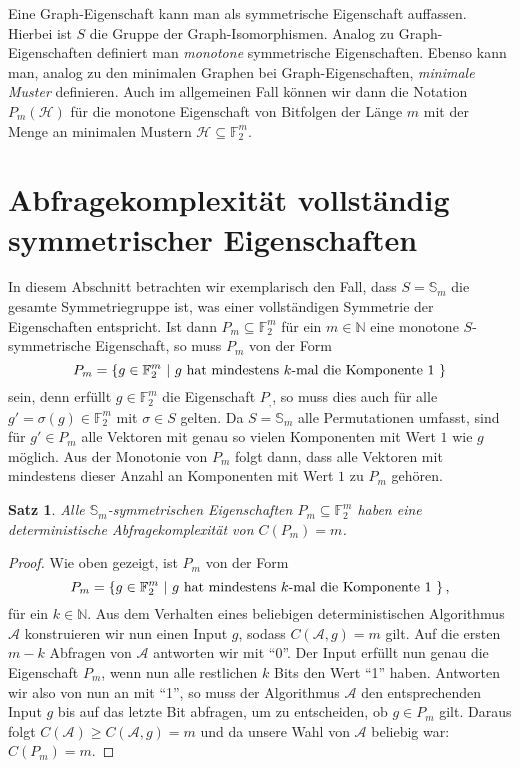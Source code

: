 \documentclass[10pt,a4paper, footheight=1mm]{scrreprt}
\newtheorem{Satz}[definition]{Satz}
\theoremstyle{definition}
\begin{document}
Eine Graph-Eigenschaft kann man als symmetrische
Eigenschaft auffassen. Hierbei ist $S$ die Gruppe
der Graph-Isomorphismen.
Analog zu Graph-Eigenschaften definiert man
\emph{monotone} symmetrische Eigenschaften. 
Ebenso kann man, analog zu den minimalen Graphen bei
Graph-Eigenschaften, \emph{minimale Muster} definieren.
Auch im allgemeinen Fall können wir dann die Notation
$P_m(\mathcal{H})$ für die monotone Eigenschaft
von Bitfolgen der Länge $m$ mit der Menge an minimalen
Mustern $\mathcal{H}\subseteq \mathbb{F}_2^m$.

\section{Abfragekomplexität vollständig symmetrischer Eigenschaften}
In diesem Abschnitt betrachten wir exemplarisch
den Fall, dass $S=\mathbb{S}_m$ die gesamte Symmetriegruppe
ist, was einer vollständigen Symmetrie der Eigenschaften entspricht.
Ist dann $P_m\subseteq \mathbb{F}_2^m$ für ein $m\in\mathbb{N}$ eine monotone 
$S$-symmetrische Eigenschaft, so muss 
$P_m$ von der Form 
$$ P_m= \{ g\in \mathbb{F}_2^m \ |
\ g \textup{ hat mindestens } k\textup{-mal die Komponente } 1 \ \}$$
sein, denn erfüllt $g\in \mathbb{F}_2^m$ die Eigenschaft
$P_,$, so muss dies auch für alle $g'=\sigma(g)\in\mathbb{F}_2^m$
mit $\sigma\in S$ gelten. Da $S=\mathbb{S}_m$ alle Permutationen
umfasst, sind für $g'\in P_m$ alle Vektoren mit
genau so vielen Komponenten mit Wert $1$ wie $g$ möglich. Aus der
Monotonie von $P_m$ folgt dann, dass alle Vektoren mit
mindestens dieser Anzahl an Komponenten mit Wert $1$ zu
$P_m$ gehören.
\begin{Satz}
\label{thm:SymmetrischeGruppe}
Alle $\mathbb{S}_m$-symmetrischen Eigenschaften 
$P_m \subseteq \mathbb{F}_2^m$ haben eine
deterministische Abfragekomplexität
von $C(P_m) = m$.
\end{Satz}
\begin{proof}
Wie oben gezeigt, ist $P_m$ von der Form
$$ P_m= \{ g\in \mathbb{F}_2^m \ |
\ g \textup{ hat mindestens } k\textup{-mal die Komponente } 1 \ \}\,,$$
für ein $k\in \mathbb{N}$.
Aus dem Verhalten eines beliebigen deterministischen Algorithmus
$\mathcal{A}$ konstruieren wir nun einen Input $g$,
sodass $C(\mathcal{A},g)=m$ gilt. Auf die ersten $m-k$
Abfragen von $\mathcal{A}$ antworten wir mit "`0"'.
Der Input erfüllt nun genau die Eigenschaft $P_m$, wenn
nun alle restlichen $k$ Bits den Wert "`1"' haben.
Antworten wir also von nun an mit "`1"', so muss der 
Algorithmus $\mathcal{A}$
den entsprechenden Input $g$ bis auf das letzte Bit abfragen,
um zu entscheiden, ob $g\in P_m$ gilt. Daraus folgt
$C(\mathcal{A}) \geq C(\mathcal{A}, g) = m$ und da unsere
Wahl von $\mathcal{A}$ beliebig war: $C(P_m)=m$.
\end{proof}
\end{document}
